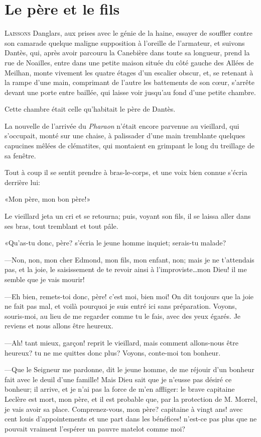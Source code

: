 \chapter{Le père et le fils}

\lettrine{L}{aissons} Danglars, aux prises avec le génie de la haine, essayer de souffler contre son camarade quelque maligne supposition à l'oreille de l'armateur, et suivons Dantès, qui, après avoir parcouru la Canebière dans toute sa longueur, prend la rue de Noailles, entre dans une petite maison située du côté gauche des Allées de Meilhan, monte vivement les quatre étages d'un escalier obscur, et, se retenant à la rampe d'une main, comprimant de l'autre les battements de son cœur, s'arrête devant une porte entre baillée, qui laisse voir jusqu'au fond d'une petite chambre.

Cette chambre était celle qu'habitait le père de Dantès.

La nouvelle de l'arrivée du \textit{Pharaon} n'était encore parvenue au vieillard, qui s'occupait, monté sur une chaise, à palissader d'une main tremblante quelques capucines mêlées de clématites, qui montaient en grimpant le long du treillage de sa fenêtre.

Tout à coup il se sentit prendre à bras-le-corps, et une voix bien connue s'écria derrière lui:

«Mon père, mon bon père!»

Le vieillard jeta un cri et se retourna; puis, voyant son fils, il se laissa aller dans ses bras, tout tremblant et tout pâle.

«Qu'as-tu donc, père? s'écria le jeune homme inquiet; serais-tu malade?

—Non, non, mon cher Edmond, mon fils, mon enfant, non; mais je ne t'attendais pas, et la joie, le saisissement de te revoir ainsi à l'improviste\dots mon Dieu! il me semble que je vais mourir!

—Eh bien, remets-toi donc, père! c'est moi, bien moi! On dit toujours que la joie ne fait pas mal, et voilà pourquoi je suis entré ici sans préparation. Voyons, souris-moi, au lieu de me regarder comme tu le fais, avec des yeux égarés. Je reviens et nous allons être heureux.

—Ah! tant mieux, garçon! reprit le vieillard, mais comment allons-nous être heureux? tu ne me quittes donc plus? Voyons, conte-moi ton bonheur.

—Que le Seigneur me pardonne, dit le jeune homme, de me réjouir d'un bonheur fait avec le deuil d'une famille! Mais Dieu sait que je n'eusse pas désiré ce bonheur; il arrive, et je n'ai pas la force de m'en affliger: le brave capitaine Leclère est mort, mon père, et il est probable que, par la protection de M. Morrel, je vais avoir sa place. Comprenez-vous, mon père? capitaine à vingt ans! avec cent louis d'appointements et une part dans les bénéfices! n'est-ce pas plus que ne pouvait vraiment l'espérer un pauvre matelot comme moi?

